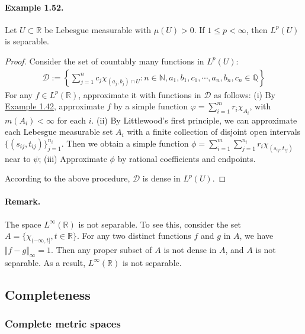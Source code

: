 \documentclass{article}
\begin{document}
\paragraph{Example 1.52.} Let $U\subset\mathbb{R}$ be Lebesgue measurable with $\mu(U)>0$. If $1\leq p <\infty$, then $L^p(U)$ is separable.
\begin{proof}
Consider the set of countably many functions in $L^p(U)$:
\begin{align*}
	\mathcal{D} := \left\{\sum_{j=1}^n c_j\chi_{(a_j,b_j)\cap U}:n\in\mathbb{N},a_1,b_1,c_1,\cdots,a_n,b_n,c_n\in\mathbb{Q}\right\}
\end{align*}
For any $f\in L^p(\mathbb{R})$, approximate it with functions in $\mathcal{D}$ as follows: (i) By \hyperref[example:1.42]{Example 1.42}, approximate $f$ by a simple function $\varphi = \sum_{i=1}^m r_i\chi_{A_i}$, with $m(A_i)<\infty$ for each $i$. (ii) By Littlewood's first principle, we can approximate each Lebesgue measurable set $A_i$ with a finite collection of disjoint open intervals $\{(s_{ij},t_{ij})\}_{j=1}^{n_i}$. Then we obtain a simple function $\phi=\sum_{i=1}^m\sum_{j=1}^{n_i} r_i\chi_{(s_{ij},t_{ij})}$ near to $\psi$; (iii) Approximate $\phi$ by rational coefficients and endpoints.

According to the above procedure, $\mathcal{D}$ is dense in $L^p(U)$.
\end{proof}

\paragraph{Remark.} The space $L^\infty(\mathbb{R})$ is not separable. To see this, consider the set $A=\{\chi_{(-\infty,t]},t\in\mathbb{R}\}$. For any two distinct functions $f$ and $g$ in $A$, we have $\Vert f-g\Vert_\infty = 1$. Then any proper subset of $A$ is not dense in $A$, and $A$ is not separable. As a result, $L^\infty(\mathbb{R})$ is not separable.

\newpage
\subsection{Completeness}
\subsubsection{Complete metric spaces}
\end{document}
